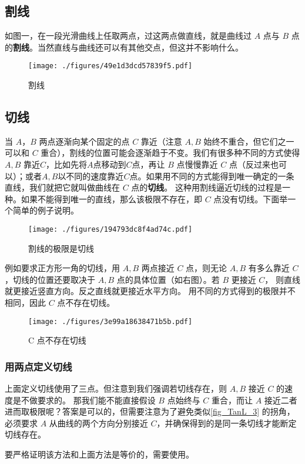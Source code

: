 


\subsection{割线}
如图一，在一段光滑曲线上任取两点，过这两点做直线，就是曲线过 $A$ 点与 $B$ 点的\textbf{割线}。当然直线与曲线还可以有其他交点，但这并不影响什么。
\begin{figure}[ht]
\centering
\texttt{[image: ./figures/49e1d3dcd57839f5.pdf]}
\caption{割线} \label{fig_TanL_1}
\end{figure}

\subsection{切线}
当 $A$，$B$ 两点逐渐向某个固定的点 $C$ 靠近（注意 $A,B$ 始终不重合，但它们之一可以和 $C$ 重合），割线的位置可能会逐渐趋于不变。我们有很多种不同的方式使得 $A, B$ 靠近$C$，比如先将$A$点移动到$C$点，再让 $B$ 点慢慢靠近 $C$ 点（反过来也可以）；或者$A, B$以不同的速度靠近$C$点。如果用不同的方式能得到唯一确定的一条直线，我们就把它就叫做曲线在 $C$ 点的\textbf{切线}。 这种用割线逼近切线的过程是一种。如果不能得到唯一的直线，那么该极限不存在，即 $C$ 点没有切线。下面举一个简单的例子说明。

\begin{figure}[ht]
\vskip 0pt
\centering
\texttt{[image: ./figures/194793dc8f4ad74c.pdf]}
\caption{割线的极限是切线} \label{fig_TanL_2}
\end{figure}
例如要求正方形一角的切线，用 $A,B$ 两点接近 $C$ 点，则无论 $A,B$ 有多么靠近 $C$，切线的位置还要取决于 $A,B$ 点的具体位置（如右图）。若 $B$ 更接近 $C$， 则直线就更接近竖直方向。反之直线就更接近水平方向。 用不同的方式得到的极限并不相同，因此 $C$ 点不存在切线。

\begin{figure}[ht]
\centering
\texttt{[image: ./figures/3e99a18638471b5b.pdf]}
\caption{C 点不存在切线} \label{fig_TanL_3}
\end{figure}

\subsubsection{用两点定义切线}
上面定义切线使用了三点。但注意到我们强调若切线存在，则 $A,B$ 接近 $C$ 的速度是不做要求的。 那我们能不能直接假设 $B$ 点始终与 $C$ 重合，而让 $A$ 接近二者进而取极限呢？答案是可以的，但需要注意为了避免类似\autoref{fig_TanL_3} 的拐角，必须要求 $A$ 从曲线的两个方向分别接近 $C$，并确保得到的是同一条切线才能断定切线存在。

要严格证明该方法和上面方法是等价的，需要使用。
